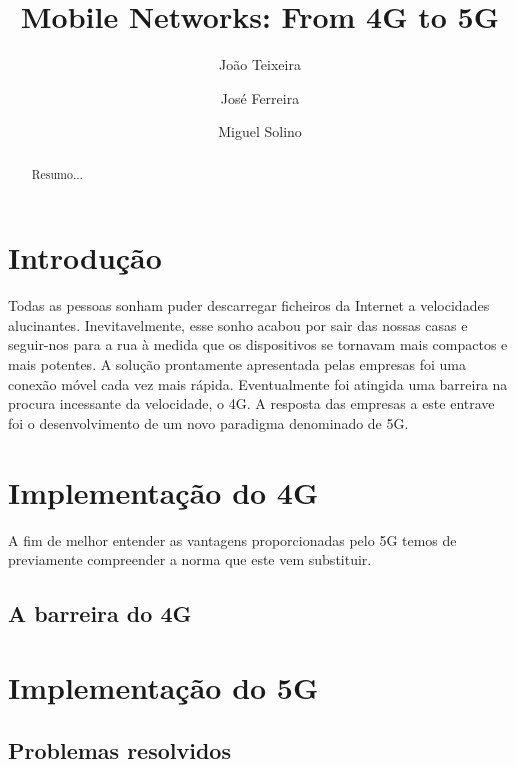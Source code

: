\documentclass{llncs}
\begin{document}
\mainmatter
\title{Mobile Networks: From 4G to 5G}


\author{João Teixeira \and José Ferreira \and Miguel Solino}



\date{}


\maketitle
\begin{abstract}
Resumo...
\end{abstract}

\section{Introdução}

Todas as pessoas sonham puder descarregar ficheiros da Internet a velocidades alucinantes.
Inevitavelmente, esse sonho acabou por sair das nossas casas e
seguir-nos para a rua à medida que os dispositivos se tornavam mais
compactos e mais potentes.
A solução prontamente apresentada pelas empresas foi uma conexão
móvel cada vez mais rápida.
Eventualmente foi atingida uma barreira na procura incessante da
velocidade, o 4G. A resposta das empresas a este entrave foi o
desenvolvimento de um novo paradigma denominado de 5G.

\section{Implementação do 4G}
A fim de melhor entender as vantagens proporcionadas pelo 5G temos
de previamente compreender a norma que este vem substituir.

\subsection{A barreira do 4G}
\section{Implementação do 5G}
\subsection{Problemas resolvidos}
\end{document}

